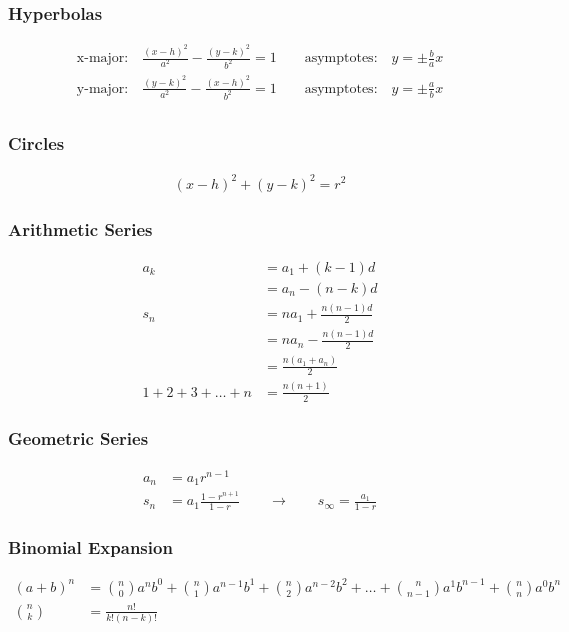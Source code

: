 \documentclass[12pt]{article}
\begin{document}
\subsubsection*{Hyperbolas}
\begin{align*}
\text{x-major:}\quad \frac{(x-h)^2}{a^2} - \frac{(y-k)^2}{b^2} = 1 
\qquad\text{asymptotes:}\quad y = \pm \frac{b}{a}x \\
\text{y-major:}\quad \frac{(y-k)^2}{a^2} - \frac{(x-h)^2}{b^2} = 1 
\qquad\text{asymptotes:}\quad y = \pm \frac{a}{b}x \\
\end{align*}

\subsubsection*{Circles}
\begin{align*}
(x-h)^2 + (y-k)^2 = r^2
\end{align*}


\subsubsection*{Arithmetic Series}
\begin{align*}
a_{k} & = a_{1} + (k-1)d \\
      & = a_{n} - (n-k)d \\[1ex]
s_{n} & = na_{1} +\frac{n(n-1)d}{2} \\
      & = na_{n} -\frac{n(n-1)d}{2} \\
      & = \frac{n(a_{1}+a_{n})}{2} \\[1ex]
1 + 2 + 3 + \ldots + n & = \frac{n(n+1)}{2}
\end{align*}

\subsubsection*{Geometric Series}
\begin{align*}
a_{n} & = a_{1} r^{n-1} \\[1ex]
s_{n} & = a_{1} \frac{1-r^{n+1}}{1-r} 
\qquad\longrightarrow\qquad
s_{\infty} = \frac{a_{1}}{1-r} 
\end{align*}

\subsubsection*{Binomial Expansion}
\begin{align*}
(a+b)^{n} 
  & = 
  \binom{n}{0} a^{n}b^{0} 
+ \binom{n}{1} a^{n-1}b^{1} 
+ \binom{n}{2} a^{n-2}b^{2} 
+ \ldots 
+ \binom{n}{n-1} a^{1}b^{n-1} 
+ \binom{n}{n} a^{0}b^{n} \\[1ex]
\binom{n}{k} 
  & = \frac{n!}{k!(n-k)!} \\
\end{align*}
\end{document}
